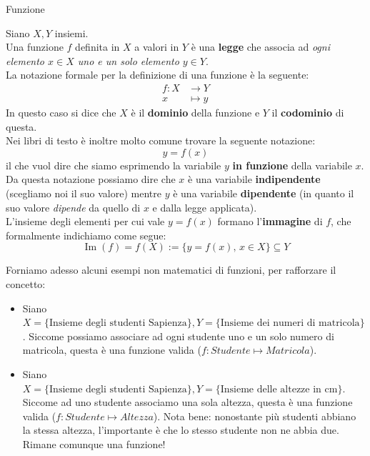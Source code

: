 \documentclass[12pt]{report}
\begin{document}
	\begin{definizione}{Funzione}{}
		
		Siano $X, Y$ insiemi.\\
		Una funzione $f$ definita in $X$ a valori in $Y$ è una \textbf{legge} che associa ad \textit{ogni elemento $x\in X$ uno e un solo elemento $y \in Y$}.\\
		La notazione formale per la definizione di una funzione è la seguente:
		\[
			\begin{aligned}
				f: X &\to Y\\
				x &\mapsto y
			\end{aligned}
		\]
		In questo caso si dice che $X$ è il \textbf{dominio} della funzione e $Y$ il \textbf{codominio} di questa.\\
		
		\smallbreak
		Nei libri di testo è inoltre molto comune trovare la seguente notazione:
		\[
			y = f(x)
		\]
		il che vuol dire che siamo esprimendo la variabile $y$ \textbf{in funzione} della variabile $x$. Da questa notazione possiamo dire che $x$ è una variabile \textbf{indipendente} (scegliamo noi il suo valore) mentre $y$ è una variabile \textbf{dipendente} (in quanto il suo valore \textit{dipende} da quello di $x$ e dalla legge applicata).\\
		
		\smallbreak
		L'insieme degli elementi per cui vale $y = f(x)$ formano l'\textbf{immagine} di $f$, che formalmente indichiamo come segue:
		\[
			\operatorname{Im}(f) = f(X) := \{y = f(x),\, x \in X\} \subseteq Y
		\]
		
	\end{definizione}
	
	Forniamo adesso alcuni esempi non matematici di funzioni, per rafforzare il concetto:
	\begin{itemize}
		
		\item Siano $X = \{\text{Insieme degli studenti Sapienza}\}, Y = \{\text{Insieme dei numeri di matricola}\}$. Siccome possiamo associare ad ogni studente uno e un solo numero di matricola, questa è una funzione valida ($f: Studente \mapsto Matricola$).
		
		\item Siano $X = \{\text{Insieme degli studenti Sapienza}\}, Y = \{\text{Insieme delle altezze in cm}\}$. Siccome ad uno studente associamo una sola altezza, questa è una funzione valida ($f: Studente \mapsto Altezza$). Nota bene: nonostante più studenti abbiano la stessa altezza, l'importante è che lo stesso studente non ne abbia due. Rimane comunque una funzione!
		
	\end{itemize}
	
\end{document}
